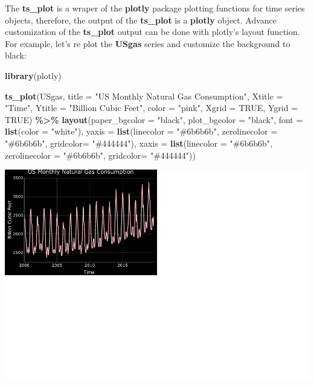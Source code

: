 \documentclass[
]{book}
\newenvironment{Shaded}{\begin{snugshade}}{\end{snugshade}}
\newcommand{\AttributeTok}[1]{\textcolor[rgb]{0.13,0.29,0.53}{#1}}
\newcommand{\ConstantTok}[1]{\textcolor[rgb]{0.56,0.35,0.01}{#1}}
\newcommand{\FunctionTok}[1]{\textcolor[rgb]{0.13,0.29,0.53}{\textbf{#1}}}
\newcommand{\NormalTok}[1]{#1}
\newcommand{\SpecialCharTok}[1]{\textcolor[rgb]{0.81,0.36,0.00}{\textbf{#1}}}
\newcommand{\StringTok}[1]{\textcolor[rgb]{0.31,0.60,0.02}{#1}}
\begin{document}
The \textbf{ts\_plot} is a wraper of the \textbf{plotly} package plotting functions for time series objects, therefore, the output of the \textbf{ts\_plot} is a \textbf{plotly} object. Advance customization of the \textbf{ts\_plot} output can be done with plotly's layout function. For example, let's re plot the \textbf{USgas} series and customize the background to black:

\begin{Shaded}
\begin{Highlighting}[]
\FunctionTok{library}\NormalTok{(plotly)}

\FunctionTok{ts\_plot}\NormalTok{(USgas,}
        \AttributeTok{title =} \StringTok{"US Monthly Natural Gas Consumption"}\NormalTok{,}
        \AttributeTok{Xtitle =} \StringTok{"Time"}\NormalTok{,}
        \AttributeTok{Ytitle =} \StringTok{"Billion Cubic Feet"}\NormalTok{,}
        \AttributeTok{color =}  \StringTok{"pink"}\NormalTok{,}
        \AttributeTok{Xgrid =} \ConstantTok{TRUE}\NormalTok{,}
        \AttributeTok{Ygrid =} \ConstantTok{TRUE}\NormalTok{) }\SpecialCharTok{\%\textgreater{}\%}
  \FunctionTok{layout}\NormalTok{(}\AttributeTok{paper\_bgcolor =} \StringTok{"black"}\NormalTok{,}
         \AttributeTok{plot\_bgcolor =} \StringTok{"black"}\NormalTok{,}
         \AttributeTok{font =} \FunctionTok{list}\NormalTok{(}\AttributeTok{color =} \StringTok{"white"}\NormalTok{),}
         \AttributeTok{yaxis =} \FunctionTok{list}\NormalTok{(}\AttributeTok{linecolor =} \StringTok{"\#6b6b6b"}\NormalTok{,}
                      \AttributeTok{zerolinecolor =} \StringTok{"\#6b6b6b"}\NormalTok{,}
                      \AttributeTok{gridcolor=} \StringTok{"\#444444"}\NormalTok{),}
         \AttributeTok{xaxis =} \FunctionTok{list}\NormalTok{(}\AttributeTok{linecolor =} \StringTok{"\#6b6b6b"}\NormalTok{,}
                      \AttributeTok{zerolinecolor =} \StringTok{"\#6b6b6b"}\NormalTok{,}
                      \AttributeTok{gridcolor=} \StringTok{"\#444444"}\NormalTok{))}
\end{Highlighting}
\end{Shaded}

\includegraphics{_main_files/figure-latex/unnamed-chunk-63-1.pdf}
\end{document}
